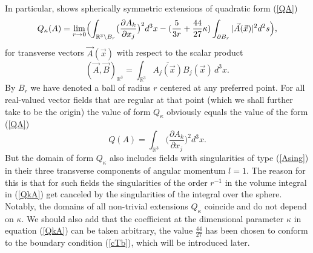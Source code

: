 \documentclass[12pt]{article}
\newcommand{\ol}{\overline}
\newcommand{\RR}{\mathbb{R}}
\begin{document}
	In particular, 
\cite{Inv}
	shows spherically symmetric extensions of quadratic form
(\ref{QA})
\begin{equation}
\label{QkA}
        Q_{\kappa}(A) = \lim_{r\to 0}\Bigl(
    \int_{\RR^{3}\setminus B_{r}}
        \bigl(\frac{\partial A_{k}}{\partial x_{j}}\bigr)^{2} d^{3} x -
    (\frac{5}{3r}+ \frac{44}{27}\kappa) \int_{\partial B_{r}}
        |\vec{A}(\vec{x})|^{2} d^{2} s \Bigr) ,
\end{equation}
	for transverse vectors
$ \vec{A}(\vec{x}) $
	with respect to the scalar product
\begin{equation*}
    (\vec{A},\vec{B})_{\RR^{3}} = \int_{\RR^{3}}
	\ol{A_{j}(\vec{x})} B_{j}(\vec{x}) \,d^{3}x .
\end{equation*}
	By
$ B_{r} $ we have denoted a ball of radius
$ r $
	centered at any preferred point.
    For all real-valued vector fields that are regular at that point
    (which we shall further take to be the origin) the value of form
$ Q_{\kappa} $
	obviously equals the value of the form
(\ref{QA})
\begin{equation*}
        Q(A) = \int_{\RR^{3}}
        \bigl(\frac{\partial A_{k}}{\partial x_{j}}\bigr)^{2} d^{3} x .
\end{equation*}
	But the domain of form
$ Q_{\kappa} $
	also includes fields with singularities of type
(\ref{Asing})
	in their three transverse components
	of angular momentum
$ l=1 $.
	The reason for this is that for such fields
	the singularities of the order
$ r^{-1} $
	in the volume integral in
(\ref{QkA})
	get canceled by the singularities of the integral over the sphere.
	Notably, the domains of all non-trivial extensions
$ Q_{\kappa} $
	coincide and do not depend on
$ \kappa $.
	We should also add that the coefficient at the dimensional parameter
$ \kappa $
	in equation
(\ref{QkA})
	can be taken arbitrary,
	the value
$ \frac{44}{27} $
	has been chosen to conform to the boundary condition
(\ref{cTb}),
	which will be introduced later.
\end{document}
